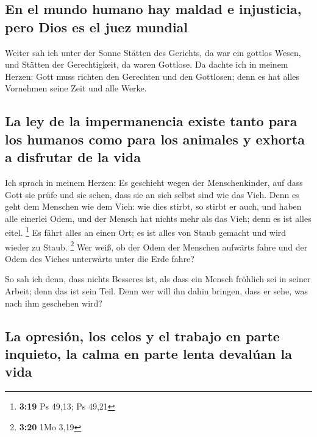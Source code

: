 \hypertarget{en-el-mundo-humano-hay-maldad-e-injusticia-pero-dios-es-el-juez-mundial}{%
\subsection{En el mundo humano hay maldad e injusticia, pero Dios es el
juez
mundial}\label{en-el-mundo-humano-hay-maldad-e-injusticia-pero-dios-es-el-juez-mundial}}

 Weiter sah ich unter der Sonne Stätten des Gerichts, da
war ein gottlos Wesen, und Stätten der Gerechtigkeit, da waren Gottlose.
 Da dachte ich in meinem Herzen: Gott muss richten den
Gerechten und den Gottlosen; denn es hat alles Vornehmen seine Zeit und
alle Werke.

\hypertarget{la-ley-de-la-impermanencia-existe-tanto-para-los-humanos-como-para-los-animales-y-exhorta-a-disfrutar-de-la-vida}{%
\subsection{La ley de la impermanencia existe tanto para los humanos
como para los animales y exhorta a disfrutar de la
vida}\label{la-ley-de-la-impermanencia-existe-tanto-para-los-humanos-como-para-los-animales-y-exhorta-a-disfrutar-de-la-vida}}

 Ich sprach in meinem Herzen: Es geschieht wegen der
Menschenkinder, auf dass Gott sie prüfe und sie sehen, dass sie an sich
selbst sind wie das Vieh.  Denn es geht dem Menschen wie
dem Vieh: wie dies stirbt, so stirbt er auch, und haben alle einerlei
Odem, und der Mensch hat nichts mehr als das Vieh; denn es ist alles
eitel. \footnote{\textbf{3:19} Ps 49,13; Ps 49,21}  Es
fährt alles an einen Ort; es ist alles von Staub gemacht und wird wieder
zu Staub. \footnote{\textbf{3:20} 1Mo 3,19}  Wer weiß, ob
der Odem der Menschen aufwärts fahre und der Odem des Viehes unterwärts
unter die Erde fahre?

 So sah ich denn, dass nichts Besseres ist, als dass ein
Mensch fröhlich sei in seiner Arbeit; denn das ist sein Teil. Denn wer
will ihn dahin bringen, dass er sehe, was nach ihm geschehen wird?

\hypertarget{la-opresiuxf3n-los-celos-y-el-trabajo-en-parte-inquieto-la-calma-en-parte-lenta-devaluxfaan-la-vida}{%
\subsection{La opresión, los celos y el trabajo en parte inquieto, la
calma en parte lenta devalúan la
vida}\label{la-opresiuxf3n-los-celos-y-el-trabajo-en-parte-inquieto-la-calma-en-parte-lenta-devaluxfaan-la-vida}}

